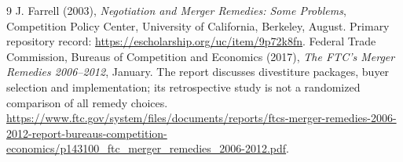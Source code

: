 \documentclass[11pt]{article}
\theoremstyle{remark}\newtheorem{remark}[theorem]{Remark}
\begin{document}
\begin{thebibliography}{9}
 J. Farrell (2003), \emph{Negotiation and Merger Remedies: Some Problems}, Competition Policy Center, University of California, Berkeley, August. Primary repository record: \url{https://escholarship.org/uc/item/9p72k8fn}.
 Federal Trade Commission, Bureaus of Competition and Economics (2017), \emph{The FTC's Merger Remedies 2006--2012}, January. The report discusses divestiture packages, buyer selection and implementation; its retrospective study is not a randomized comparison of all remedy choices. \url{https://www.ftc.gov/system/files/documents/reports/ftcs-merger-remedies-2006-2012-report-bureaus-competition-economics/p143100_ftc_merger_remedies_2006-2012.pdf}.
\end{thebibliography}
\end{document}
